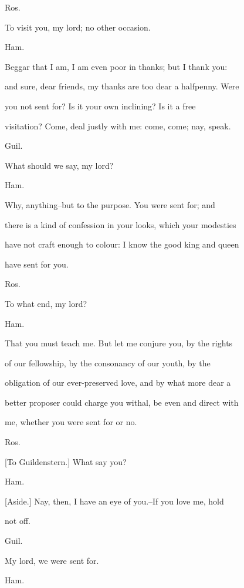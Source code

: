 \documentclass[12pt]{book}
\begin{document}
Ros.

To visit you, my lord; no other occasion.



Ham.

Beggar that I am, I am even poor in thanks; but I thank you:

and sure, dear friends, my thanks are too dear a halfpenny. Were

you not sent for? Is it your own inclining? Is it a free

visitation? Come, deal justly with me: come, come; nay, speak.



Guil.

What should we say, my lord?



Ham.

Why, anything--but to the purpose. You were sent for; and

there is a kind of confession in your looks, which your modesties

have not craft enough to colour: I know the good king and queen

have sent for you.



Ros.

To what end, my lord?



Ham.

That you must teach me. But let me conjure you, by the rights

of our fellowship, by the consonancy of our youth, by the

obligation of our ever-preserved love, and by what more dear a

better proposer could charge you withal, be even and direct with

me, whether you were sent for or no.



Ros.

[To Guildenstern.] What say you?



Ham.

[Aside.] Nay, then, I have an eye of you.--If you love me, hold

not off.



Guil.

My lord, we were sent for.



Ham.
\end{document}
